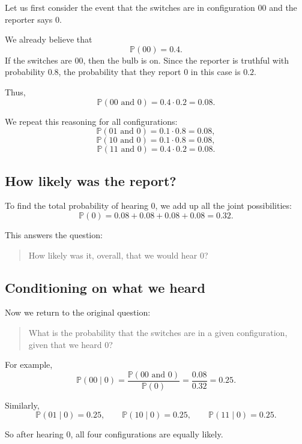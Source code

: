 \documentclass[11pt]{article}
\theoremstyle{remark}
\begin{document}
Let us first consider the event that the switches are in configuration \(00\) and the reporter says \(0\).

We already believe that
\[
\mathbb P(00) = 0.4.
\]
If the switches are \(00\), then the bulb is on. Since the reporter is truthful with probability \(0.8\), the probability that they report \(0\) in this case is \(0.2\).

Thus,
\[
\mathbb P(00 \text{ and } 0) = 0.4 \cdot 0.2 = 0.08.
\]

We repeat this reasoning for all configurations:
\[
\mathbb P(01 \text{ and } 0) = 0.1 \cdot 0.8 = 0.08,
\]
\[
\mathbb P(10 \text{ and } 0) = 0.1 \cdot 0.8 = 0.08,
\]
\[
\mathbb P(11 \text{ and } 0) = 0.4 \cdot 0.2 = 0.08.
\]

\vspace{2mm}

\subsection{How likely was the report?}

To find the total probability of hearing \(0\), we add up all the joint possibilities:
\[
\mathbb P(0)
=
0.08 + 0.08 + 0.08 + 0.08
=
0.32.
\]

This answers the question:

\begin{quote}
How likely was it, overall, that we would hear \(0\)?
\end{quote}

\vspace{2mm}

\subsection{Conditioning on what we heard}

Now we return to the original question:

\begin{quote}
What is the probability that the switches are in a given configuration, given that we heard \(0\)?
\end{quote}

For example,
\[
\mathbb P(00 \mid 0)
=
\frac{\mathbb P(00 \text{ and } 0)}{\mathbb P(0)}
=
\frac{0.08}{0.32}
=
0.25.
\]

Similarly,
\[
\mathbb P(01 \mid 0)=0.25,\qquad
\mathbb P(10 \mid 0)=0.25,\qquad
\mathbb P(11 \mid 0)=0.25.
\]

So after hearing \(0\), all four configurations are equally likely.
\end{document}
